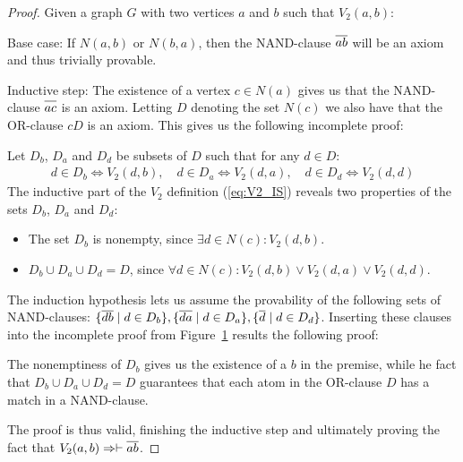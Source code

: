 \begin{proof}
  Given a graph $G$ with two vertices $a$ and $b$ such that $V_2(a,b)$:

  Base case:
  If $N(a,b)$ or $N(b,a)$, then the NAND-clause $\ol{ab}$ will be an axiom and thus trivially provable.

  Inductive step:
  The existence of a vertex $c \in N(a)$ gives us that the NAND-clause $\ol{ac}$ is an axiom.
  Letting $D$ denoting the set $N(c)$ we also have that the OR-clause $cD$ is an axiom.
  This gives us the following incomplete proof:\par
  \begin{figure}[!h]
    \centering
    \begin{prooftree*}
      \Hypo{\dots}
    \end{prooftree*}
    \caption{}
    \label{fig:proof_v2_partial}
  \end{figure}
  Let $D_b$, $D_a$ and $D_d$ be subsets of $D$ such that for any $d \in D$:
  \begin{align}
    d \in D_b \Leftrightarrow V_2(d,b),\quad d \in D_a \Leftrightarrow V_2(d,a),\quad d \in D_d \Leftrightarrow V_2(d,d)
  \end{align}
  The inductive part of the $V_2$ definition (\ref{eq:V2_IS}) reveals two properties of the sets $D_b$, $D_a$ and $D_d$:
  \begin{itemize}
    \item The set $D_b$ is nonempty, since $\exists d \in N(c): V_2(d,b)$.
    \item $D_b \cup D_a \cup D_d = D$, since $\forall d \in N(c): V_2(d,b) \vee V_2(d,a) \vee V_2(d,d)$.
  \end{itemize}
  The induction hypothesis lets us assume the provability of the following sets of NAND-clauses:
  $\{ \ol{db} \;|\; d \in D_b \},\{ \ol{da} \;|\; d \in D_a \},\{ \ol{d} \;|\; d \in D_d \}$.
  Inserting these clauses into the incomplete proof from Figure~\ref{fig:proof_v2_partial} results the following proof:\par
  \begin{figure}[!h]
    \centering
    \begin{prooftree*}
    \end{prooftree*}
    \caption{}
    \label{fig:proof_v2}
  \end{figure}
The nonemptiness of $D_b$ gives us the existence of a $b$ in the premise, while he fact that $D_b \cup D_a \cup D_d = D$ guarantees that each atom in the OR-clause $D$ has a match in a NAND-clause.

The proof is thus valid, finishing the inductive step and ultimately proving the fact that $V_2(a,b) \Rightarrow \vdash \ol{ab}$.
\end{proof}
